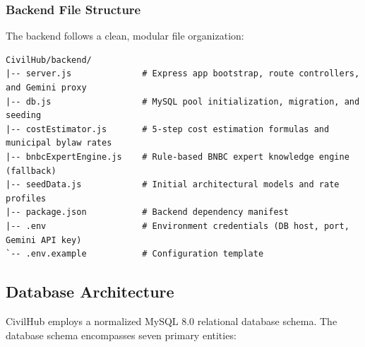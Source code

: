\documentclass[12pt,a4paper]{article}
\begin{document}
\subsubsection{Backend File Structure}
The backend follows a clean, modular file organization:
\begin{lstlisting}
CivilHub/backend/
|-- server.js              # Express app bootstrap, route controllers, and Gemini proxy
|-- db.js                  # MySQL pool initialization, migration, and seeding
|-- costEstimator.js       # 5-step cost estimation formulas and municipal bylaw rates
|-- bnbcExpertEngine.js    # Rule-based BNBC expert knowledge engine (fallback)
|-- seedData.js            # Initial architectural models and rate profiles
|-- package.json           # Backend dependency manifest
|-- .env                   # Environment credentials (DB host, port, Gemini API key)
`-- .env.example           # Configuration template
\end{lstlisting}

\subsection{Database Architecture}
CivilHub employs a normalized MySQL 8.0 relational database schema. The database schema encompasses seven primary entities:
\end{document}
